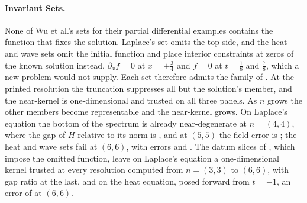 \paragraph{Invariant Sets.} None of Wu et al.'s sets for their partial differential examples contains the function that fixes the solution. Laplace's set omits the top side, and the heat and wave sets omit the initial function and place interior constraints at zeros of the known solution instead, $\partial_xf=0$ at $x=\pm\tfrac34$ and $f=0$ at $t=\tfrac18$ and $\tfrac78$, which a new problem would not supply. Each set therefore admits the family of . At the printed resolution the truncation suppresses all but the solution's member, and the near-kernel is one-dimensional and trusted on all three panels. As $n$ grows the other members become representable and the near-kernel grows. On Laplace's equation the bottom of the spectrum is already near-degenerate at $n=(4,4)$, where the gap of $H$ relative to its norm is , and at $(5,5)$ the field error is ; the heat and wave sets fail at $(6,6)$, with errors  and . The datum slices of , which impose the omitted function, leave on Laplace's equation a one-dimensional kernel trusted at every resolution computed from $n=(3,3)$ to $(6,6)$, with gap ratio  at the last, and on the heat equation, posed forward from $t=-1$, an error of  at $(6,6)$.


